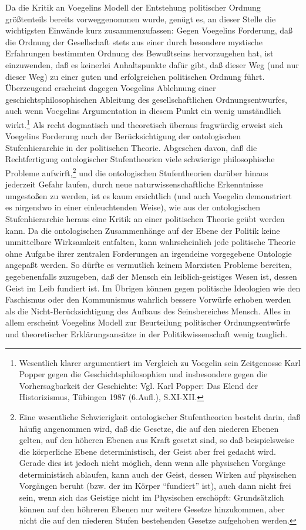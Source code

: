 Da die Kritik an Voegelins Modell der Entstehung politischer Ordnung
größtenteils bereits vorweggenommen wurde, genügt es, an dieser Stelle
die wichtigsten Einwände kurz zusammenzufassen: Gegen Voegelins
Forderung, daß die Ordnung der Gesellschaft stets aus einer durch
besondere mystische Erfahrungen bestimmten Ordnung des Bewußtseins
hervorzugehen hat, ist einzuwenden, daß es keinerlei Anhaltspunkte dafür
gibt, daß dieser Weg (und nur dieser Weg) zu einer guten und
erfolgreichen politischen Ordnung führt. Überzeugend erscheint dagegen
Voegelins Ablehnung einer geschichtsphilosophischen Ableitung des
gesellschaftlichen Ordnungsentwurfes, auch wenn Voegelins Argumentation
in diesem Punkt ein wenig umständlich wirkt.\footnote{Wesentlich klarer
  argumentiert im Vergleich zu Voegelin sein Zeitgenosse Karl Popper
  gegen die Geschichtsphilosophien und insbesondere gegen die
  Vorhersagbarkeit der Geschichte: Vgl. Karl Popper: Das Elend der
  Historizismus, Tübingen 1987 (6.Aufl.), S.XI-XII.} Als recht
dogmatisch und theoretisch überaus fragwürdig erweist sich Voegelins
Forderung nach der Berücksichtigung der ontologischen Stufenhierarchie
in der politischen Theorie. Abgesehen davon, daß die Rechtfertigung
ontologischer Stufentheorien viele schwierige philosophische Probleme
aufwirft,\footnote{Eine wesentliche Schwierigkeit ontologischer
  Stufentheorien besteht darin, daß häufig angenommen wird, daß die
  Gesetze, die auf den niederen Ebenen gelten, auf den höheren Ebenen
  aus Kraft gesetzt sind, so daß beispielsweise die körperliche Ebene
  deterministisch, der Geist aber frei gedacht wird. Gerade dies ist
  jedoch nicht möglich, denn wenn alle physischen Vorgänge
  deterministisch ablaufen, kann auch der Geist, dessen Wirken auf
  physischen Vorgängen beruht (bzw. der im Körper "`fundiert"' ist),
  auch dann nicht frei sein, wenn sich das Geistige nicht im Physischen
  erschöpft: Grundsätzlich können auf den höhreren Ebenen nur weitere
  Gesetze hinzukommen, aber nicht die auf den niederen Stufen
  bestehenden Gesetze aufgehoben werden.} und die ontologischen
Stufentheorien darüber hinaus jederzeit Gefahr laufen, durch neue
naturwissenschaftliche Erkenntnisse umgestoßen zu werden, ist es kaum
ersichtlich (und auch Voegelin demonstriert es nirgendwo in einer
einleuchtenden Weise), wie aus der ontologischen Stufenhierarchie heraus
eine Kritik an einer politischen Theorie geübt werden kann. Da die
ontologischen Zusammenhänge auf der Ebene der Politik keine unmittelbare
Wirksamkeit entfalten, kann wahrscheinlich jede politische Theorie ohne
Aufgabe ihrer zentralen Forderungen an irgendeine vorgegebene Ontologie
angepaßt werden. So dürfte es vermutlich keinem Marxisten Probleme
bereiten, gegebenenfalls zuzugeben, daß der Mensch ein
leiblich-geistiges Wesen ist, dessen Geist im Leib fundiert ist. Im
Übrigen können gegen politische Ideologien wie den Faschismus oder den
Kommunismus wahrlich bessere Vorwürfe erhoben werden als die
Nicht-Berücksichtigung des Aufbaus des Seinsbereiches Mensch. Alles in
allem erscheint Voegelins Modell zur Beurteilung politischer
Ordnungsentwürfe und theoretischer Erklärungsansätze in der
Politikwissenschaft wenig tauglich.

